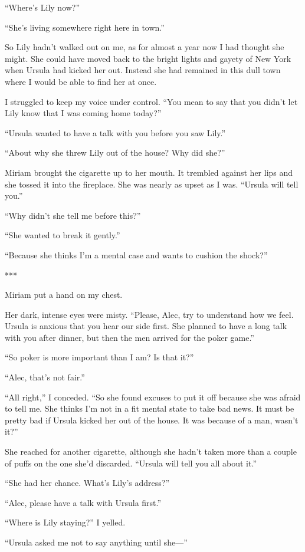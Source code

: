 \documentclass{novel}
\begin{document}
{“Where’s Lily now?”

“She’s living somewhere right here in town.”

So Lily hadn’t walked out on me, as for almost a year now I had thought she might. She could have moved back to the bright lights and gayety of New York when Ursula had kicked her out. Instead she had remained in this dull town where I would be able to find her at once.

I struggled to keep my voice under control. “You mean to say that you didn’t let Lily know that I was coming home today?”

“Ursula wanted to have a talk with you before you saw Lily.”

“About why she threw Lily out of the house? Why did she?”

Miriam brought the cigarette up to her mouth. It trembled against her lips and she tossed it into the fireplace. She was nearly as upset as I was. “Ursula will tell you.”

“Why didn’t she tell me before this?”

“She wanted to break it gently.”

“Because she thinks I’m a mental case and wants to cushion the shock?”

***

Miriam put a hand on my chest.

Her dark, intense eyes were misty. “Please, Alec, try to understand how we feel. Ursula is anxious that you hear our side first. She planned to have a long talk with you after dinner, but then the men arrived for the poker game.”

“So poker is more important than I am? Is that it?”

“Alec, that’s not fair.”

“All right,” I conceded. “So she found excuses to put it off because she was afraid to tell me. She thinks I’m not in a fit mental state to take bad news. It must be pretty bad if Ursula kicked her out of the house. It was because of a man, wasn’t it?”

She reached for another cigarette, although she hadn’t taken more than a couple of puffs on the one she’d discarded. “Ursula will tell you all about it.”

“She had her chance. What’s Lily’s address?”

“Alec, please have a talk with Ursula first.”

“Where is Lily staying?” I yelled.

“Ursula asked me not to say anything until she—”

}
\end{document}
